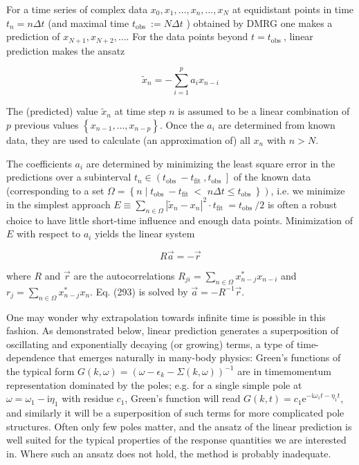 \documentclass[12pt]{article}
\begin{document}
For a time series of complex data $x_{0}, x_{1}, \ldots, x_{n}, \ldots, x_{N}$ at equidistant points in time $t_{n}=n \Delta t$ (and maximal time $t_{\text {obs }}:=N \Delta t$ ) obtained by DMRG one makes a prediction of $x_{N+1}, x_{N+2}, \ldots$. For the data points beyond $t=t_{\text {obs }}$, linear prediction makes the ansatz


\begin{equation*}
\tilde{x}_{n}=-\sum_{i=1}^{p} a_{i} x_{n-i} \tag{292}
\end{equation*}


The (predicted) value $\tilde{x}_{n}$ at time step $n$ is assumed to be a linear combination of $p$ previous values $\left\{x_{n-1}, \ldots, x_{n-p}\right\}$. Once the $a_{i}$ are determined from known data, they are used to calculate (an approximation of) all $x_{n}$ with $n>N$.

The coefficients $a_{i}$ are determined by minimizing the least square error in the predictions over a subinterval $t_{n} \in\left(t_{\text {obs }}-t_{\text {fit }}, t_{\text {obs }}\right]$ of the known data (corresponding to a set $\Omega=\left\{n \mid t_{\text {obs }}-t_{\text {fit }}<\right.$ $\left.\left.n \Delta t \leq t_{\text {obs }}\right\}\right)$, i.e. we minimize in the simplest approach $E \equiv \sum_{n \in \Omega}\left|\tilde{x}_{n}-x_{n}\right|^{2} \cdot t_{\text {fit }}=t_{\text {obs }} / 2$ is often a robust choice to have little short-time influence and enough data points. Minimization of $E$ with respect to $a_{i}$ yields the linear system


\begin{equation*}
R \vec{a}=-\vec{r} \tag{293}
\end{equation*}


where $R$ and $\vec{r}$ are the autocorrelations $R_{j i}=\sum_{n \in \Omega} x_{n-j}^{*} x_{n-i}$ and $r_{j}=\sum_{n \in \Omega} x_{n-j}^{*} x_{n}$. Eq. (293) is solved by $\vec{a}=-R^{-1} \vec{r}$.

One may wonder why extrapolation towards infinite time is possible in this fashion. As demonstrated below, linear prediction generates a superposition of oscillating and exponentially decaying (or growing) terms, a type of time-dependence that emerges naturally in many-body physics: Green's functions of the typical form $G(k, \omega)=\left(\omega-\epsilon_{k}-\Sigma(k, \omega)\right)^{-1}$ are in timemomentum representation dominated by the poles; e.g. for a single simple pole at $\omega=\omega_{1}-\mathrm{i} \eta_{1}$ with residue $c_{1}$, Green's function will read $G(k, t)=c_{1} \mathrm{e}^{-\mathrm{i} \omega_{1} t-\eta_{1} t}$, and similarly it will be a superposition of such terms for more complicated pole structures. Often only few poles matter, and the ansatz of the linear prediction is well suited for the typical properties of the response quantities we are interested in. Where such an ansatz does not hold, the method is probably inadequate.
\end{document}
